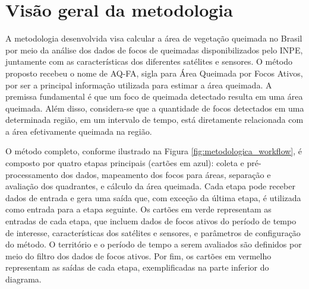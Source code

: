 \documentclass[cic,tc]{iiufrgs}
\begin{document}
\section{Visão geral da metodologia}

A metodologia desenvolvida visa calcular a área de vegetação queimada no Brasil por meio da análise dos dados de focos de queimadas disponibilizados pelo INPE, juntamente com as características dos diferentes satélites e sensores. O método proposto recebeu o nome de AQ-FA, sigla para Área Queimada por Focos Ativos, por ser a principal informação utilizada para estimar a área queimada. A premissa fundamental é que um foco de queimada detectado resulta em uma área queimada. Além disso, considera-se que a quantidade de focos detectados em uma determinada região, em um intervalo de tempo, está diretamente relacionada com a área efetivamente queimada na região.

O método completo, conforme ilustrado na Figura \ref{fig:metodologica_workflow}, é composto por quatro etapas principais (cartões em azul): coleta e pré-processamento dos dados, mapeamento dos focos para áreas, separação e avaliação dos quadrantes, e cálculo da área queimada. Cada etapa pode receber dados de entrada e gera uma saída que, com exceção da última etapa, é utilizada como entrada para a etapa seguinte. Os cartões em verde representam as entradas de cada etapa, que incluem dados de focos ativos do período de tempo de interesse, características dos satélites e sensores, e parâmetros de configuração do método. O território e o período de tempo a serem avaliados são definidos por meio do filtro dos dados de focos ativos. Por fim, os cartões em vermelho representam as saídas de cada etapa, exemplificadas na parte inferior do diagrama.
\end{document}
